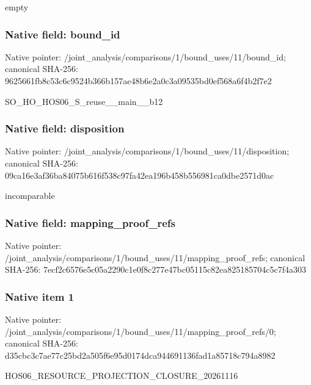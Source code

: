 \documentclass[10pt,a4paper]{article}
\begin{document}
\begingroup\raggedright\sloppy empty\par\endgroup

\subsubsection{Native field: bound\_\allowbreak{}id}
Native pointer: /joint\_\allowbreak{}analysis/comparisons/1/bound\_\allowbreak{}uses/11/bound\_\allowbreak{}id; canonical SHA-256: 9625661fb8c53c6c9524b366b157ae48b6e2a0c3a09535bd0ef568a6f4b2f7e2

\begingroup\raggedright\sloppy SO\_\allowbreak{}HO\_\allowbreak{}HOS06\_\allowbreak{}S\_\allowbreak{}reuse\_\allowbreak{}\_\allowbreak{}main\_\allowbreak{}\_\allowbreak{}b12\par\endgroup

\subsubsection{Native field: disposition}
Native pointer: /joint\_\allowbreak{}analysis/comparisons/1/bound\_\allowbreak{}uses/11/disposition; canonical SHA-256: 09ca16e3af36ba84075b616f538c97fa42ea196b458b556981ca0dbe2571d0ac

\begingroup\raggedright\sloppy incomparable\par\endgroup

\subsubsection{Native field: mapping\_\allowbreak{}proof\_\allowbreak{}refs}
Native pointer: /joint\_\allowbreak{}analysis/comparisons/1/bound\_\allowbreak{}uses/11/mapping\_\allowbreak{}proof\_\allowbreak{}refs; canonical SHA-256: 7ecf2c6576e5c05a2290c1e0f8c277e47bc05115c82ea825185704c5c7f4a303

\subsubsection{Native item 1}
Native pointer: /joint\_\allowbreak{}analysis/comparisons/1/bound\_\allowbreak{}uses/11/mapping\_\allowbreak{}proof\_\allowbreak{}refs/0; canonical SHA-256: d35cbc3c7ae77c25bd2a505f6e95d0174dca944691136fad1a85718c794a8982

\begingroup\raggedright\sloppy HOS06\_\allowbreak{}RESOURCE\_\allowbreak{}PROJECTION\_\allowbreak{}CLOSURE\_\allowbreak{}20261116\par\endgroup
\end{document}
